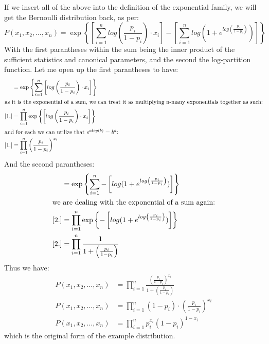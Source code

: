 \documentclass[encoding=utf8,british]{tumphthesis}
\begin{document}
\begin{tcolorbox}[breakable, width=\linewidth, sharp corners=all, colback=white!95!black]
                If we insert all of the above into the definition of the exponential family, we will get the Bernoulli distribution back, as per:
                \begin{equation*}
                    P(x_1, x_2, \dots , x_n) = \exp\left\{ \left[ \sum_{i=1}^n log \left(\frac{p_i}{1 - p_i}\right) \cdot x_i \right] - \left[ \sum_{i=1}^n log( 1 + e^{log \left(\frac{p_i}{1 - p_i}\right)})\right]\right\}
                \end{equation*}
                With the first parantheses within the sum being the inner product of the sufficient statistics and canonical parameters, and the second the log-partition function. 
                Let me open up the first parantheses to have:
                \begin{align*}
                    [1.] &= \exp\left\{\sum_{i=1}^n \left[ log \left(\frac{p_i}{1 - p_i}\right) \cdot x_i \right]\right\} \\
                    \intertext{as it is the exponential of a sum, we can treat it as multiplying n-many exponentials together as such:}
                    [1.] &= \prod_{i=1}^n \exp\left\{ \left[ log \left(\frac{p_i}{1 - p_i}\right) \cdot x_i \right]\right\} \\
                    \intertext{and for each we can utilize that $e^{a log(b)} = b^a$:}
                    [1.] &= \prod_{i=1}^n \left(\frac{p_i}{1 - p_i}\right)^{x_i} \\
                \end{align*}
                And the second parantheses:
                \begin{align*}
                    [2.] &= \exp\left\{\sum_{i=1}^n - \left[log( 1 + e^{log \left(\frac{p_i}{1 - p_i}\right)})\right]\right\} \\
                    \intertext{we are dealing with the exponential of a sum again:}
                    [2.] &= \prod_{i=1}^n \exp\left\{ - \left[log( 1 + e^{log \left(\frac{p_i}{1 - p_i}\right)})\right]\right\} \\
                    [2.] &= \prod_{i=1}^n  \frac{1}{1 + \left(\frac{p_i}{1 - p_i}\right)} \\
                \end{align*}
                Thus we have:
                \begin{align*}
                    P(x_1, x_2, \dots , x_n) &= \prod_{i=1}^n \frac{\left(\frac{p_i}{1 - p_i}\right)^{x_i}}{1 + \left(\frac{p_i}{1 - p_i}\right)} \\
                    P(x_1, x_2, \dots , x_n) &= \prod_{i=1}^n (1 - p_i) \cdot \left( \frac{p_i}{1 - p_i} \right)^{x_i} \\
                    P(x_1, x_2, \dots , x_n) &= \prod_{i=1}^n p_i^{x_i}(1-p_i)^{1 - x_i}
                \end{align*}
                which is the original form of the example distribution.
                \\


\end{tcolorbox}
\end{document}
